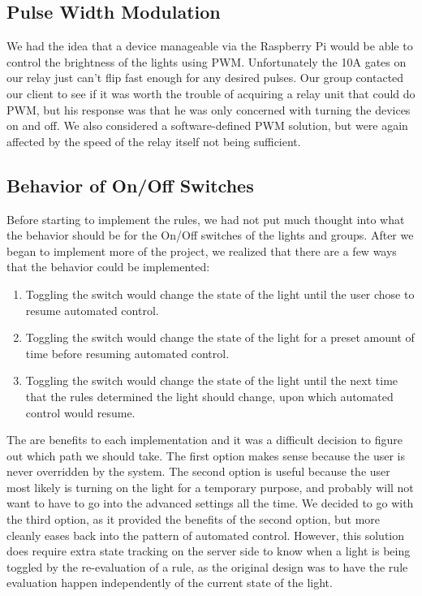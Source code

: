 \documentclass[10pt,draftclsnofoot,onecolumn]{IEEEtran}
\begin{document}
\subsection{Pulse Width Modulation}

We had the idea that a device manageable via the Raspberry Pi would be able to
control the brightness of the lights using PWM. Unfortunately the 10A gates on
our relay just can't flip fast enough for any desired pulses. Our group
contacted our client to see if it was worth the trouble of acquiring a relay
unit that could do PWM, but his response was that he was only concerned with
turning the devices on and off. We also considered a software-defined PWM
solution, but were again affected by the speed of the relay itself not being
sufficient.

\subsection{Behavior of On/Off Switches}

Before starting to implement the rules, we had not put much thought into what
the behavior should be for the On/Off switches of the lights and groups. After
we began to implement more of the project, we realized that there are a few
ways that the behavior could be implemented:

\begin{enumerate}
  \item Toggling the switch would change the state of the light until the user
      chose to resume automated control.
  \item Toggling the switch would change the state of the light for a preset
      amount of time before resuming automated control.
  \item Toggling the switch would change the state of the light until the next
      time that the rules determined the light should change, upon which
      automated control would resume.
\end{enumerate}

The are benefits to each implementation and it was a difficult decision to
figure out which path we should take. The first option makes sense because the
user is never overridden by the system. The second option is useful because the
user most likely is turning on the light for a temporary purpose, and probably
will not want to have to go into the advanced settings all the time. We decided
to go with the third option, as it provided the benefits of the second option,
but more cleanly eases back into the pattern of automated control.  However,
this solution does require extra state tracking on the server side to know when
a light is being toggled by the re-evaluation of a rule, as the original design
was to have the rule evaluation happen independently of the current state of
the light.
\end{document}
